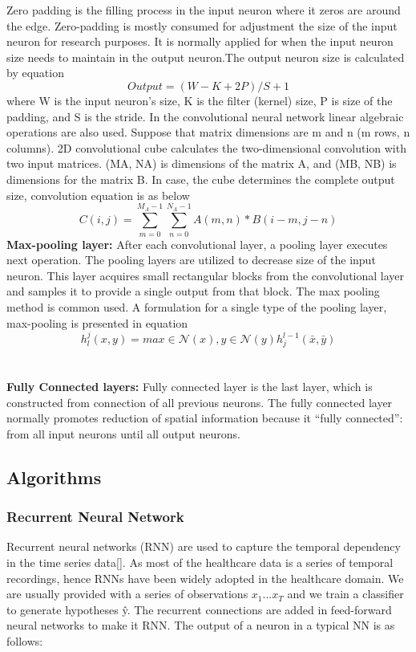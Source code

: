 \documentclass[12pt,a4paper]{article}
\begin{document}
		Zero padding is the filling process in the input neuron where it zeros are around the edge. Zero-padding is mostly consumed for adjustment the size of the input neuron for research purposes. It is normally applied for when the input neuron size needs to maintain in the output neuron.The output neuron size is calculated by equation \\
	    \begin{equation}Output = (W-K+2P)/S+1\end{equation}
	    where W is the input neuron’s size, K is the filter (kernel) size, P is size of the padding, and S is the stride.
	    In the convolutional neural network linear algebraic operations are also used. Suppose that matrix dimensions are m and n (m rows, n columns). 2D convolutional cube calculates the two-dimensional convolution with two input matrices. (MA, NA) is dimensions of the matrix A, and (MB, NB) is dimensions for the matrix B. In case, the cube determines the complete output size, convolution equation is as below 
	    \begin{equation}C(i,j)=\sum^{{M_A}- 1}_{m=0}\sum^{{N_A}- 1}_{n=0}A(m,n)*B(i-m,j-n)\end{equation}
\textbf{Max-pooling layer:}	After each convolutional layer, a pooling layer executes next operation. The pooling layers are utilized to decrease size of the input neuron. This layer acquires small rectangular blocks from the convolutional layer and samples it to provide a single output from that block. The max pooling method is common used. A formulation for a single type of the pooling layer, max-pooling is presented in equation \begin{equation}
    h_l^j(x,y)=max  \in \mathcal{N}(x),y \in \mathcal{N}(y)h^{l-1}_j(\bar{x},\bar{y})
\end{equation}\\ \\
\textbf{Fully Connected layers:} Fully connected layer is the last layer, which is constructed from connection of all previous neurons. The fully connected layer normally promotes reduction of spatial information because it “fully connected”: from all input neurons until all output neurons.


\subsection{Algorithms}

\subsubsection{Recurrent Neural Network}
Recurrent neural networks (RNN) are used to capture the temporal dependency in the time series data[]. As most of the healthcare data is a series of temporal recordings, hence RNNs have been widely adopted in the healthcare domain. We are usually provided with a series of observations $x_1$...$x_T$ and we train a classifier to generate hypotheses \^{y}. The recurrent connections are added in feed-forward neural networks to make it RNN. The output of a neuron in a typical NN is as follows:
    
\end{document}
